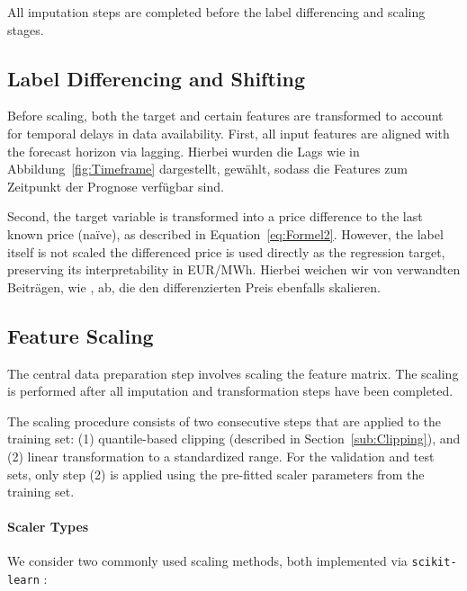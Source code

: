 \documentclass[preprint,12pt,nonatbib]{elsarticle}
\begin{document}
All imputation steps are completed before the label differencing and scaling stages.

\subsection{Label Differencing and Shifting}
\label{sub:LabelDifferencing}

Before scaling, both the target and certain features are transformed to account for temporal delays in data availability.
First, all input features are aligned with the forecast horizon via lagging.
Hierbei wurden die Lags wie in Abbildung~\ref{fig:Timeframe} dargestellt, gewählt, sodass die Features zum Zeitpunkt der Prognose verfügbar sind.

Second, the target variable is transformed into a price difference to the last known price (na\"ive), as described in Equation~\ref{eq:Formel2}.
However, the label itself is not scaled the differenced price is used directly as the regression target, preserving its interpretability in EUR/MWh.
Hierbei weichen wir von verwandten Beiträgen, wie \cite{Narajewski.2020, puć2024}, ab, die den differenzierten Preis ebenfalls skalieren.

\subsection{Feature Scaling}
\label{sub:Scaling}

The central data preparation step involves scaling the feature matrix.
The scaling is performed after all imputation and transformation steps have been completed.

The scaling procedure consists of two consecutive steps that are applied to the training set: (1) quantile-based clipping (described in Section~\ref{sub:Clipping}), and (2) linear transformation to a standardized range.
For the validation and test sets, only step (2) is applied using the pre-fitted scaler parameters from the training set.

\paragraph{Scaler Types}
We consider two commonly used scaling methods, both implemented via \texttt{scikit-learn} \cite{Pedregosa.2011}:
\end{document}

